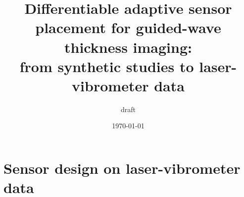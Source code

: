 \documentclass[11pt]{article}
\title{Differentiable adaptive sensor placement for guided-wave thickness imaging:\\ from synthetic studies to laser-vibrometer data}
\author{draft}
\date{\today}
\begin{document}
\maketitle







\section{Sensor design on laser-vibrometer data}\label{sec:lab-design}








\appendix


\end{document}

